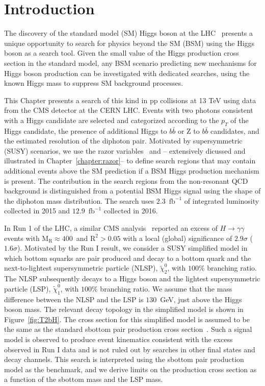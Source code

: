 \section{Introduction}\label{sec:intro}
The discovery of the standard model (SM) Higgs boson at the LHC~\cite{ATLAShiggs,CMShiggs} 
presents a unique opportunity to search for physics beyond the SM (BSM) using the Higgs boson as a search
tool. Given the small value of the Higgs production cross section in the standard model, 
any BSM scenario predicting new mechanisms for Higgs boson production can be investigated 
with dedicated searches, using the known Higgs mass to suppress SM background processes.


This Chapter presents a search of this kind in pp collisions at 13 TeV using data from the CMS detector at the CERN LHC.
Events with two photons consistent with a Higgs candidate are selected and categorized
according to the $p_{T}$ of the Higgs candidate, the presence of additional 
Higgs to $b\bar{b}$ or Z to $b\bar{b}$ candidates, and the estimated resolution of the diphoton
pair. Motivated by supersymmetric (SUSY) scenarios, we use the razor variables~\cite{razor2010, rogan}
\MR and \Rtwo -- extensively dicussed and illustrated in Chapter~\ref{chapter:razor}-- to define search regions that may contain additional events above the SM prediction
if a BSM Higgs production mechanism is present.  
The contribution in the search regions from the non-resonant QCD background is distinguished from a potential BSM 
Higgs signal using the shape of the diphoton mass distribution. The search uses $2.3$~$\mathrm{fb}^{-1}$ of 
integrated luminosity collected in 2015 and $12.9$~$\mathrm{fb}^{-1}$ collected in 2016. 


In Run 1 of the LHC, a similar CMS analysis~\cite{SUS-14-017} reported an excess of $H \to \gamma \gamma$ 
events with $\mathrm{M_R}\approx 400$~\GeV and $\mathrm{R^2}>0.05$ with a local (global) significance of
$2.9\sigma$ ($1.6\sigma$). Motivated by the Run I result, we consider a
SUSY simplified model in which bottom squarks are pair produced and decay
to a bottom quark and the next-to-lightest supersymmetric particle (NLSP), 
$\tilde{\chi}^{0}_{2}$, with $100\%$ branching ratio.
The NLSP subsequently decays to a Higgs boson and the lightest 
supersymmetric particle (LSP), $\tilde{\chi}^{0}_{1}$, with $100\%$ branching ratio. 
We assume that the mass difference between the NLSP and the LSP is $130$~GeV,
just above the Higgs boson mass.
The relevant decay topology in the simplified model is shown in Figure~\ref{fig:T2bH}. 
The cross section for this simplified model is assumed to be the same
as the standard sbottom pair production cross section~\cite{Borschensky:2014cia}.
Such a signal model is observed to produce event kinematics consistent with the
excess observed in Run I data and is not ruled out by searches in
other final states and decay channels. This search is interpreted using
the sbottom pair production model as the benchmark, and we derive limits 
on the production cross section as a function of the sbottom mass and the
LSP mass.


